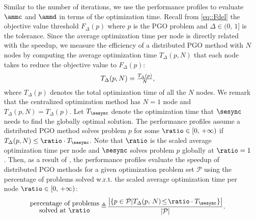 Similar to the number of iterations, we use the performance profiles to evaluate $\ammc$ and $\ammd$ in terms of the optimization time. Recall from \cref{eq::Fdel} the objective value threshold $F_{\Delta}(p)$ where $p$ is the PGO problem and $\Delta\in(0,\,1]$ is the tolerance. Since the average optimization time per node is directly related with the speedup, we measure the efficiency of a distributed PGO method with $N$ nodes by computing the average optimization time $T_{\Delta}(p,N)$ that each node takes to reduce the objective value to $F_{\Delta}(p)$:
\vspace{-0.25em}
\begin{equation}
\nonumber
T_{\Delta}(p,N)=\tfrac{T_\Delta(p)}{N},
\vspace{-0.25em}
\end{equation}
where $T_\Delta(p)$ denotes the total optimization time of all the $N$ nodes. We remark that the centralized optimization method has $N=1$ node and $T_{\Delta}(p,N)=T_{\Delta}(p)$. Let $T_{\sesync}$ denote the optimization time that $\sesync$ needs to find the globally optimal solution. The performance profiles assume a distributed PGO method solves problem $p$  for some $\ratio\in[0,\,+\infty)$ if $T_{\Delta}(p,N)\leq \ratio\cdot T_{\sesync}$. Note that $\ratio$ is the scaled average optimization time per node and $\sesync$ solves problem $p$ globally at $\ratio=1$. Then, as a result of \cite{dolan2002benchmarking}, the performance profiles evaluate the speedup of distributed PGO methods for a given optimization problem set $\mathcal{P}$ using  the percentage of problems solved w.r.t. the scaled average optimization time per node $\ratio\in[0,\,+\infty)$: 
\vspace{-0.25em}
\begin{equation}
	\nonumber
	\substack{\text{\normalsize percentage of problems}\\ \text{\normalsize  solved at $\ratio$}} \triangleq\! \frac{\big|\{p\in\mathcal{P}|T_{\Delta}(p,\,N)\!\leq\! \ratio\cdot T_{\sesync}\}\big|}{|\mathcal{P}|}.
\end{equation}

